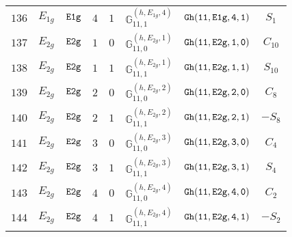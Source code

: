 \documentclass[fleqn,8pt]{jsarticle}
\begin{document}
\begin{table}[ht!]
\begin{center}
\begin{tabular}{cccccccc}
$ 136 $ & $ E_{1g} $ & $ {\tt E1g} $ & $ 4 $ & $ 1 $ & $ \mathbb{G}_{11,1}^{(h,E_{1g},4)} $ & $ {\tt Gh(11,E1g,4,1)} $ & $ S_{1} $ \\
$ 137 $ & $ E_{2g} $ & $ {\tt E2g} $ & $ 1 $ & $ 0 $ & $ \mathbb{G}_{11,0}^{(h,E_{2g},1)} $ & $ {\tt Gh(11,E2g,1,0)} $ & $ C_{10} $ \\
$ 138 $ & $ E_{2g} $ & $ {\tt E2g} $ & $ 1 $ & $ 1 $ & $ \mathbb{G}_{11,1}^{(h,E_{2g},1)} $ & $ {\tt Gh(11,E2g,1,1)} $ & $ S_{10} $ \\
$ 139 $ & $ E_{2g} $ & $ {\tt E2g} $ & $ 2 $ & $ 0 $ & $ \mathbb{G}_{11,0}^{(h,E_{2g},2)} $ & $ {\tt Gh(11,E2g,2,0)} $ & $ C_{8} $ \\
$ 140 $ & $ E_{2g} $ & $ {\tt E2g} $ & $ 2 $ & $ 1 $ & $ \mathbb{G}_{11,1}^{(h,E_{2g},2)} $ & $ {\tt Gh(11,E2g,2,1)} $ & $ - S_{8} $ \\
$ 141 $ & $ E_{2g} $ & $ {\tt E2g} $ & $ 3 $ & $ 0 $ & $ \mathbb{G}_{11,0}^{(h,E_{2g},3)} $ & $ {\tt Gh(11,E2g,3,0)} $ & $ C_{4} $ \\
$ 142 $ & $ E_{2g} $ & $ {\tt E2g} $ & $ 3 $ & $ 1 $ & $ \mathbb{G}_{11,1}^{(h,E_{2g},3)} $ & $ {\tt Gh(11,E2g,3,1)} $ & $ S_{4} $ \\
$ 143 $ & $ E_{2g} $ & $ {\tt E2g} $ & $ 4 $ & $ 0 $ & $ \mathbb{G}_{11,0}^{(h,E_{2g},4)} $ & $ {\tt Gh(11,E2g,4,0)} $ & $ C_{2} $ \\
$ 144 $ & $ E_{2g} $ & $ {\tt E2g} $ & $ 4 $ & $ 1 $ & $ \mathbb{G}_{11,1}^{(h,E_{2g},4)} $ & $ {\tt Gh(11,E2g,4,1)} $ & $ - S_{2} $ \\
 \hline \hline
\end{tabular}
\end{center}
\end{table}
\end{document}
